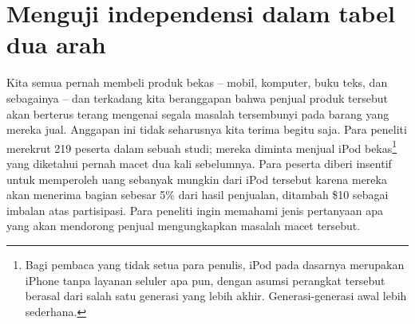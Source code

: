 

{}

\section{Menguji independensi dalam tabel dua arah}
\label{twoWayTablesAndChiSquare}


\newcommand{\iPodAA}{2}
\newcommand{\iPodAB}{23}
\newcommand{\iPodAC}{36}
\newcommand{\iPodAD}{61}
\newcommand{\iPodAFraction}{0.2785}
\newcommand{\iPodAExpected}{20.33}
\newcommand{\iPodBA}{71}
\newcommand{\iPodBB}{50}
\newcommand{\iPodBC}{37}
\newcommand{\iPodBD}{158}
\newcommand{\iPodBFraction}{0.7215}
\newcommand{\iPodBExpected}{52.67}
\newcommand{\iPodDA}{73}
\newcommand{\iPodDB}{73}
\newcommand{\iPodDC}{73}
\newcommand{\iPodDD}{219}
\newcommand{\iPodN}{\iPodDD}

Kita semua pernah membeli produk bekas --
mobil, komputer, buku teks, dan sebagainya --
dan terkadang kita beranggapan bahwa penjual produk tersebut
akan berterus terang mengenai segala masalah tersembunyi pada
barang yang mereka jual.
Anggapan ini tidak seharusnya kita terima begitu saja.
Para peneliti merekrut \iPodN{} peserta dalam sebuah studi; mereka
diminta menjual iPod bekas\footnote{Bagi pembaca yang tidak setua
  para penulis, iPod pada dasarnya merupakan iPhone tanpa
  layanan seluler apa pun, dengan asumsi perangkat tersebut berasal dari salah satu
  generasi yang lebih akhir. Generasi-generasi awal lebih sederhana.}
yang diketahui pernah macet dua kali sebelumnya.
Para peserta diberi insentif untuk memperoleh uang sebanyak mungkin
dari iPod tersebut karena mereka akan menerima bagian sebesar 5\%
dari hasil penjualan, ditambah \$10 sebagai imbalan atas partisipasi.
Para peneliti ingin memahami jenis pertanyaan apa
yang akan mendorong penjual mengungkapkan masalah macet tersebut.

